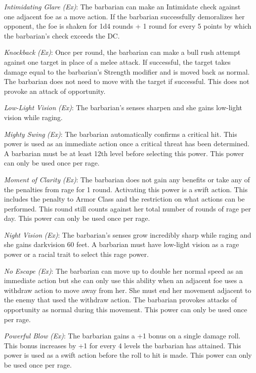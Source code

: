 \textit{Intimidating Glare} \textit{(Ex)}: The barbarian can make an Intimidate check against one adjacent foe as a move action. If the barbarian successfully demoralizes her opponent, the foe is shaken for 1d4 rounds + 1 round for every 5 points by which the barbarian's check exceeds the DC.
				
\textit{Knockback} \textit{(Ex)}: Once per round, the barbarian can make a bull rush attempt against one target in place of a melee attack. If successful, the target takes damage equal to the barbarian's Strength modifier and is moved back as normal. The barbarian does not need to move with the target if successful. This does not provoke an attack of opportunity.
				
\textit{Low-Light Vision} \textit{(Ex)}: The barbarian's senses sharpen and she gains low-light vision while raging.
				
\textit{Mighty Swing} \textit{(Ex)}: The barbarian automatically confirms a critical hit. This power is used as an immediate action once a critical threat has been determined. A barbarian must be at least 12th level before selecting this power. This power can only be used once per rage.
				
\textit{Moment of Clarity} \textit{(Ex)}: The barbarian does not gain any benefits or take any of the penalties from rage for 1 round. Activating this power is a swift action. This includes the penalty to Armor Class and the restriction on what actions can be performed. This round still counts against her total number of rounds of rage per day. This power can only be used once per rage.
				
\textit{Night Vision} \textit{(Ex)}: The barbarian's senses grow incredibly sharp while raging and she gains darkvision 60 feet. A barbarian must have low-light vision as a rage power or a racial trait to select this rage power.
				
\textit{No Escape (Ex)}: The barbarian can move up to double her normal speed as an immediate action but she can only use this ability when an adjacent foe uses a withdraw action to move away from her. She must end her movement adjacent to the enemy that used the withdraw action. The barbarian provokes attacks of opportunity as normal during this movement. This power can only be used once per rage.
				
\textit{Powerful Blow (Ex)}: The barbarian gains a +1 bonus on a single damage roll. This bonus increases by +1 for every 4 levels the barbarian has attained. This power is used as a swift action before the roll to hit is made. This power can only be used once per rage.
				
